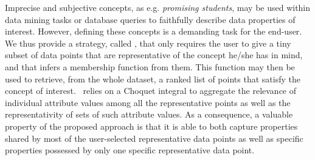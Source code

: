 
  Imprecise and subjective concepts, as e.g. {\it promising students}, 
  may be used within data mining tasks or database queries to faithfully describe
  data properties of interest.
  However, defining these concepts is a demanding task for
  the end-user. We thus provide a strategy, called \nom, that
  only requires the user to give a tiny subset of data points that
  are representative of the concept he/she has in mind, and that
  infers a membership function from them. This function may then be
  used to retrieve, from the whole dataset, a ranked list of points that satisfy the concept of interest. \nom\ relies on a
  Choquet integral to aggregate the relevance of individual attribute
  values among all the representative points as well as the
  representativity of sets of such attribute values.  As a
  consequence, a valuable property of the proposed approach is that it
  is able to both capture properties shared by most of the
  user-selected representative data points as well as specific
  properties possessed by only one specific representative data point.

